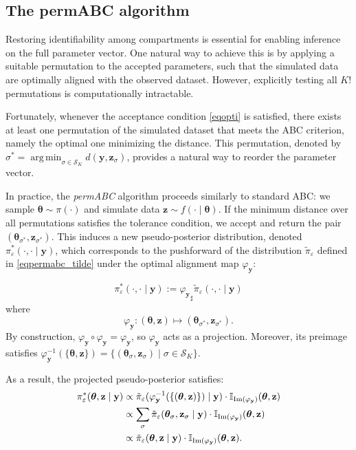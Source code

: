 \documentclass[11pt,a4paper]{article}
\def\obsdata{\mathbf{y}}
\def\param{\boldsymbol{\theta}}
\def\parprop{\boldsymbol{\theta}}
\def\proj{\varphi_{\obsdata}}
\def\simdata{\mathbf{z}}
\def\projsharp{{\varphi_{\mathbf{y}}}_{\sharp}}
\DeclareMathOperator*{\argmin}{arg\,min}
\theoremstyle{plain}
\theoremstyle{definition}
\theoremstyle{remark}
\begin{document}
\subsection{The permABC algorithm}
\label{secpermabc_star}

Restoring identifiability among compartments is essential for enabling inference on the full parameter vector. One natural way to achieve this is by applying a suitable permutation to the accepted parameters, such that the simulated data are optimally aligned with the observed dataset. However, explicitly testing all \( K! \) permutations is computationally intractable.

Fortunately, whenever the acceptance condition \eqref{eqopti} is satisfied, there exists at least one permutation of the simulated dataset that meets the ABC criterion, namely the optimal one minimizing the distance. This permutation, denoted by \( \sigma^* = \argmin_{\sigma \in \mathcal{S}_K} d(\obsdata, \simdata_{\sigma}) \), provides a natural way to reorder the parameter vector.

In practice, the \emph{permABC} algorithm proceeds similarly to standard ABC: we sample \( \parprop \sim \pi(\cdot) \) and simulate data \( \simdata \sim f(\cdot \mid \parprop) \). If the minimum distance over all permutations satisfies the tolerance condition, we accept and return the pair \( (\parprop_{\sigma^*}, \simdata_{\sigma^*}) \). This induces a new pseudo-posterior distribution, denoted \( \pi_{\varepsilon}^*(\cdot, \cdot \mid \obsdata) \), which corresponds to the pushforward of the distribution \( \tilde{\pi}_\varepsilon \) defined in \eqref{eqpermabc_tilde} under the optimal alignment map \( \proj \):

\begin{equation}
\label{eqproj}
\pi^{*}_{\varepsilon}(\cdot, \cdot \mid \obsdata)
:= \projsharp \tilde{\pi}_{\varepsilon}(\cdot, \cdot \mid \obsdata)
\end{equation}
where
\[
\proj: (\param, \simdata) \mapsto (\param_{\sigma^*}, \simdata_{\sigma^*}).
\]
By construction, \( \proj \circ \proj = \proj \), so \( \proj \) acts as a projection. Moreover, its preimage satisfies \( \proj^{-1}(\{\param, \simdata\}) = \{(\param_{\sigma}, \simdata_{\sigma}) \mid \sigma \in \mathcal{S}_K\} \).

As a result, the projected pseudo-posterior satisfies:
\begin{equation*}
    \begin{split}
        \pi_{\varepsilon}^* (\param, \simdata \mid \obsdata) &  \propto \Tilde \pi_{\varepsilon} (\proj^{-1}(\{(\param, \simdata)\}) \mid \obsdata)\cdot \mathbb I_{\text{Im}(\proj)}(\param,\simdata)\\
        & \propto \sum_{\sigma} \Tilde \pi_{\varepsilon} (\param_{\sigma}, \simdata_{\sigma} \mid \obsdata)\cdot \mathbb I_{\text{Im}(\proj)}(\param,\simdata)\\
        & \propto \tilde \pi_{\varepsilon}(\param, \simdata\mid \obsdata) \cdot \mathbb I_{\text{Im}(\proj)}(\param,\simdata).
    \end{split}
\end{equation*}
\end{document}
